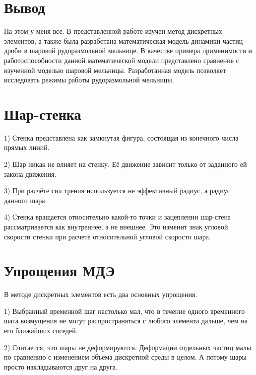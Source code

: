 \documentclass[a4paper]{article}
\begin{document}
\section{Вывод}

На этом у меня все.
В представленной работе изучен метод дискретных элементов, а также была разработана математическая модель динамики частиц дроби в шаровой рудоразмольной мельнице.
В качестве примера применимости и работоспособности данной математической модели представлено сравнение с изученной моделью шаровой мельницы.
Разработанная модель позволяет исследовать режимы работы рудоразмольной мельницы.


\section{Шар-стенка}

1) Стенка представлена как замкнутая фигура, состоящая из конечного числа прямых линий.

2) Шар никак не влияет на стенку. 
Её движение зависит только от заданного ей закона движения.

3) При расчёте сил трения используется не эффективный радиус, а радиус данного шара.

4) Стенка вращается относительно какой-то точки и зацеплении шар-стена рассматривается как внутреннее, а не внешнее. 
Это изменит знак угловой скорости стенки при расчете относительной угловой скорости шара.


\section{Упрощения МДЭ}

В методе дискретных элементов есть два основных упрощения.

1) Выбранный временной шаг настолько мал, что в течение одного временного шага возмущения не могут распространяться с любого элемента дальше, чем на его ближайших соседей. 

2) Считается, что шары не деформируются.
Деформации отдельных частиц малы по сравнению с изменением объёма дискретной среды в целом.
А потому шары просто накладываются друг на друга.
\end{document}
